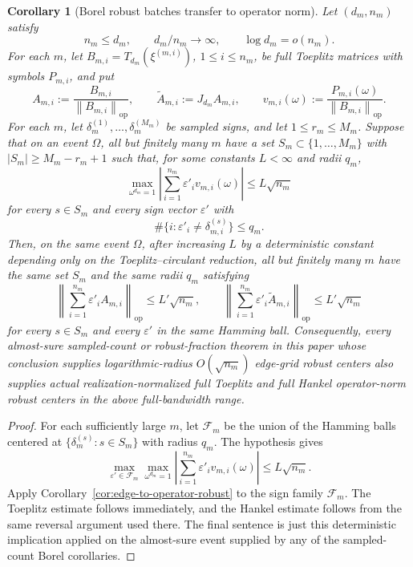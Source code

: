 \documentclass[11pt]{amsart}
\numberwithin{equation}{section}
\newtheorem{corollary}[theorem]{Corollary}
\theoremstyle{definition}
\theoremstyle{remark}
\newcommand{\op}{\mathrm{op}}
\newcommand{\norm}[1]{\left\lVert #1\right\rVert}
\newcommand{\abs}[1]{\left\lvert #1\right\rvert}
\newcommand{\eps}{\varepsilon}
\begin{document}
\begin{corollary}[Borel robust batches transfer to operator norm]
\label{cor:borel-edge-to-operator-batches}
Let \((d_m,n_m)\) satisfy
\[
  n_m\le d_m,\qquad d_m/n_m\to\infty,\qquad \log d_m=o(n_m).
\]
For each \(m\), let \(B_{m,i}=T_{d_m}(\xi^{(m,i)})\),
\(1\le i\le n_m\), be full Toeplitz matrices with symbols \(P_{m,i}\), and put
\[
  A_{m,i}:=\frac{B_{m,i}}{\norm{B_{m,i}}_{\op}},
  \qquad
  \widetilde A_{m,i}:=J_{d_m}A_{m,i},
  \qquad
  v_{m,i}(\omega):=\frac{P_{m,i}(\omega)}{\norm{B_{m,i}}_{\op}} .
\]
For each \(m\), let
\(\delta_m^{(1)},\ldots,\delta_m^{(M_m)}\) be sampled signs, and let
\(1\le r_m\le M_m\).  Suppose that on an event \(\Omega\), all but finitely
many \(m\) have a set
\(S_m\subset\{1,\ldots,M_m\}\) with \(\abs{S_m}\ge M_m-r_m+1\) such that, for
some constants \(L<\infty\) and radii \(q_m\),
\[
  \max_{\omega^{d_m}=1}
  \left|\sum_{i=1}^{n_m}\eps'_i v_{m,i}(\omega)\right|
  \le L\sqrt{n_m}
\]
for every \(s\in S_m\) and every sign vector \(\eps'\) with
\[
  \#\{i:\eps'_i\ne\delta_{m,i}^{(s)}\}\le q_m .
\]
Then, on the same event \(\Omega\), after increasing \(L\) by a deterministic
constant depending only on the Toeplitz--circulant reduction, all but finitely
many \(m\) have the same set \(S_m\) and the same radii \(q_m\) satisfying
\[
  \left\|\sum_{i=1}^{n_m}\eps'_i A_{m,i}\right\|_{\op}
  \le L'\sqrt{n_m},
  \qquad
  \left\|\sum_{i=1}^{n_m}\eps'_i \widetilde A_{m,i}\right\|_{\op}
  \le L'\sqrt{n_m}
\]
for every \(s\in S_m\) and every \(\eps'\) in the same Hamming ball.
Consequently, every almost-sure sampled-count or robust-fraction theorem in
this paper whose conclusion supplies logarithmic-radius \(O(\sqrt{n_m})\)
edge-grid robust centers also supplies actual realization-normalized full
Toeplitz and full Hankel operator-norm robust centers in the above
full-bandwidth range.
\end{corollary}

\begin{proof}
For each sufficiently large \(m\), let \(\mathcal F_m\) be the union of the
Hamming balls centered at \(\{\delta_m^{(s)}:s\in S_m\}\) with radius \(q_m\).
The hypothesis gives
\[
  \max_{\eps'\in\mathcal F_m}\max_{\omega^{d_m}=1}
  \left|\sum_{i=1}^{n_m}\eps'_i v_{m,i}(\omega)\right|
  \le L\sqrt{n_m}.
\]
Apply Corollary~\ref{cor:edge-to-operator-robust} to the sign family
\(\mathcal F_m\).  The Toeplitz estimate follows immediately, and the Hankel
estimate follows from the same reversal argument used there.  The final sentence
is just this deterministic implication applied on the almost-sure event supplied
by any of the sampled-count Borel corollaries.
\end{proof}
\end{document}
